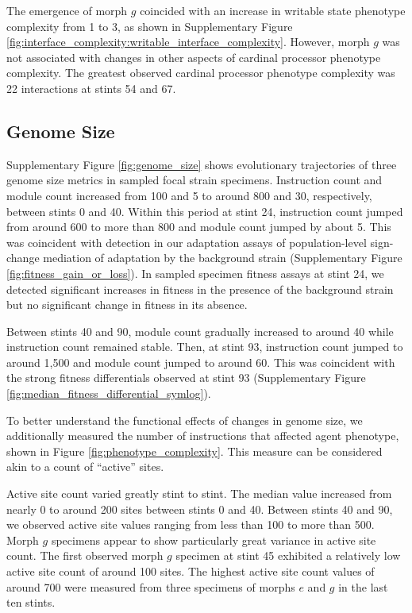 The emergence of morph $g$ coincided with an increase in writable state phenotype complexity from 1 to 3, as shown in Supplementary Figure \ref{fig:interface_complexity:writable_interface_complexity}.
However, morph $g$ was not associated with changes in other aspects of cardinal processor phenotype complexity.
The greatest observed cardinal processor phenotype complexity was 22 interactions at stints 54 and 67.

\subsection{Genome Size}

Supplementary Figure \ref{fig:genome_size} shows evolutionary trajectories of three genome size metrics in sampled focal strain specimens.
Instruction count and module count increased from 100 and 5 to around 800 and 30, respectively, between stints 0 and 40.
Within this period at stint 24, instruction count jumped from around 600 to more than 800 and module count jumped by about 5.
This was coincident with detection in our adaptation assays of population-level sign-change mediation of adaptation by the background strain (Supplementary Figure \ref{fig:fitness_gain_or_loss}).
In sampled specimen fitness assays at stint 24, we detected significant increases in fitness in the presence of the background strain but no significant change in fitness in its absence.

Between stints 40 and 90, module count gradually increased to around 40 while instruction count remained stable.
Then, at stint 93, instruction count jumped to around 1,500 and module count jumped to around 60.
This was coincident with the strong fitness differentials observed at stint 93 (Supplementary Figure \ref{fig:median_fitness_differential_symlog}).

To better understand the functional effects of changes in genome size, we additionally measured the number of instructions that affected agent phenotype, shown in Figure \ref{fig:phenotype_complexity}.
This measure can be considered akin to a count of ``active'' sites.

Active site count varied greatly stint to stint.
The median value increased from nearly 0 to around 200 sites between stints 0 and 40.
Between stints 40 and 90, we observed active site values ranging from less than 100 to more than 500.
Morph $g$ specimens appear to show particularly great variance in active site count.
The first observed morph $g$ specimen at stint 45 exhibited a relatively low active site count of around 100 sites.
The highest active site count values of around 700 were measured from three specimens of morphs $e$ and $g$ in the last ten stints.

